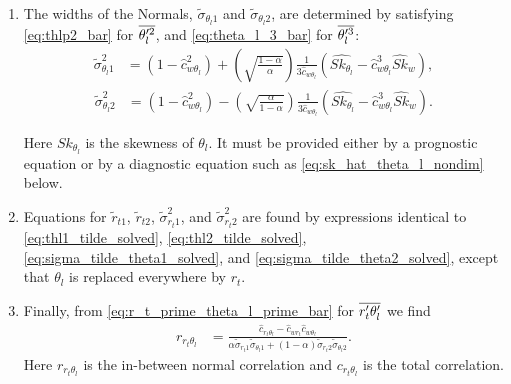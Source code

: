 \begin{enumerate}
    \item The widths of the Normals, $\tilde{\sigma}_{\theta_l 1}$ and $\tilde{\sigma}_{\theta_l 2}$, are determined by satisfying \cref{eq:thlp2_bar} for $\overline{\theta_l'^2}$, and \cref{eq:theta_l_3_bar} for $\overline{\theta_l'^3}$:
    \begin{align}
        \label{eq:sigma_tilde_theta1_solved}
        \tilde{\sigma}_{\theta_l 1}^2
        &= \left(1-\widehat{c}_{w \theta_l}^2 \right) + \left(\sqrt{\frac{1 - \alpha}{\alpha}}\right) \frac{1}{3 \widehat{c}_{w \theta_l}} \left( \widehat{Sk_{\theta_l}} - \widehat{c}_{w \theta_l}^3 \widehat{Sk}_w \right),
    \end{align}
    \begin{align}
        \label{eq:sigma_tilde_theta2_solved}
        \tilde{\sigma}_{\theta_l 2}^2
        &= \left(1 - \widehat{c}_{w \theta_l}^2 \right) - \left(\sqrt{\frac{\alpha}{1 - \alpha}}\right) \frac{1}{3 \widehat{c}_{w \theta_l}} \left( \widehat{Sk_{\theta_l}} - \widehat{c}_{w \theta_l}^3 \widehat{Sk}_w \right).
    \end{align}

    Here $Sk_{\theta_l}$ is the skewness of $\theta_l$.
    It must be provided either by a prognostic equation or by a diagnostic equation such as \cref{eq:sk_hat_theta_l_nondim} below.

    \item Equations for $\tilde{r}_{t1}$, $\tilde{r}_{t2}$, $\tilde{\sigma}_{r_t 1}^2$, and $\tilde{\sigma}_{r_t 2}^2$ are found by expressions identical to \cref{eq:thl1_tilde_solved}, \cref{eq:thl2_tilde_solved}, \cref{eq:sigma_tilde_theta1_solved}, and \cref{eq:sigma_tilde_theta2_solved}, except that $\theta_l$ is replaced everywhere by $r_t$.

    \item Finally, from \cref{eq:r_t_prime_theta_l_prime_bar} for $\overline{r_t' \theta_l'}$ we find
    \begin{align}
        \label{eq:r_r_t_theta_l}
        r_{r_t \theta_l}
        &= \frac{\widehat{c}_{r_t \theta_l} - \widehat{c}_{w r_t} \widehat{c}_{w \theta_l}}{\alpha \tilde{\sigma}_{r_{t}1}\tilde{\sigma}_{\theta_{l}1} + (1-\alpha) \tilde{\sigma}_{r_{t}2} \tilde{\sigma}_{\theta_{l}2}}.
    \end{align}
    Here $r_{r_t \theta_l}$ is the in-between normal correlation and $c_{r_t \theta_l}$ is the total correlation.
\end{enumerate}